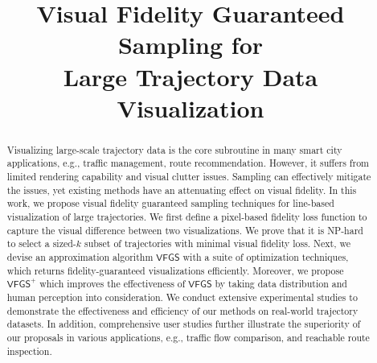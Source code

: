 \documentclass[sigconf, nonacm]{acmart}
\newcommand{\vats}{\mathsf{VFGS}}
\newcommand{\avats}{\mathsf{VFGS}^{+}}
\begin{document}
\title{Visual Fidelity Guaranteed Sampling for \\ Large Trajectory Data Visualization}



\renewcommand{\shortauthors}{Qiaomu Shen, et al.}
\renewcommand{\shorttitle}{Paper ID: xxx}

\begin{abstract}
Visualizing large-scale trajectory data is the core subroutine in many smart city applications, e.g., traffic management, route recommendation.
However, it suffers from limited rendering capability and visual clutter issues.
Sampling can effectively mitigate the issues, yet existing methods have an attenuating effect on visual fidelity.
In this work, we propose visual fidelity guaranteed sampling techniques for line-based visualization of large trajectories.
We first define a pixel-based fidelity loss function to capture the visual difference between two visualizations.
We prove that it is NP-hard to select a sized-$k$ subset of trajectories with minimal visual fidelity loss.
Next, we devise an approximation algorithm $\vats$ with a suite of optimization techniques, which returns fidelity-guaranteed visualizations efficiently.
Moreover, we propose $\avats$ which improves the effectiveness of $\vats$ by taking data distribution and human perception into consideration.
We conduct extensive experimental studies to demonstrate the effectiveness and efficiency of our methods on real-world trajectory datasets.
In addition, comprehensive user studies further illustrate the superiority of our proposals in various applications, e.g., traffic flow comparison, and reachable route inspection.
\end{abstract}
\end{document}
